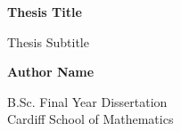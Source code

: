 \begin{titlepage}
    \begin{center}
        \vspace*{5cm}

        \textbf{Thesis Title}

        \vspace{0.5cm}
        Thesis Subtitle

        \vspace{1.5cm}

        \textbf{Author Name}

        \vfill

        B.Sc. Final Year Dissertation\\

        \vspace{0.5cm}
        Cardiff School of Mathematics

        \vspace{1.5cm}



    \end{center}
\end{titlepage}
